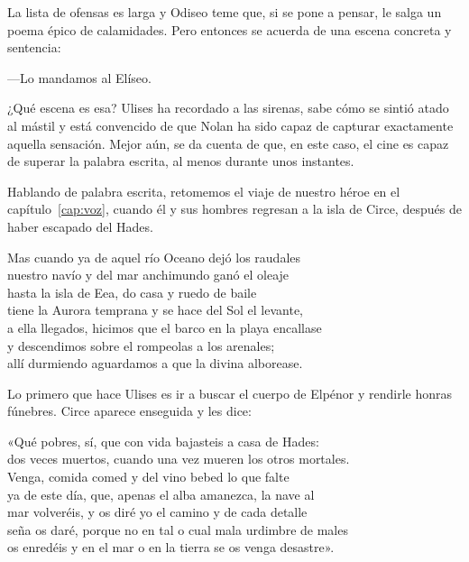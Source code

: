 La lista de ofensas es larga y Odiseo teme que, si se pone a pensar, le salga un poema épico de calamidades. Pero entonces se acuerda de una escena concreta y sentencia:

---Lo mandamos al Elíseo.

¿Qué escena es esa? 
Ulises ha recordado a las sirenas, sabe cómo se sintió atado al mástil y está convencido de que Nolan ha sido capaz de capturar exactamente aquella sensación. Mejor aún, se da cuenta de que, en este caso, el cine es capaz de superar la palabra escrita, al menos durante unos instantes.

Hablando de palabra escrita, retomemos el viaje de nuestro héroe en el capítulo~\ref{cap:voz}, cuando él y sus hombres regresan a la isla de Circe, después de haber escapado del Hades.

\begin{versocita}
Mas cuando ya de aquel río Oceano dejó los raudales\\
nuestro navío y del mar anchimundo ganó el oleaje\\
hasta la isla de Eea, do casa y ruedo de baile\\
tiene la Aurora temprana y se hace del Sol el levante,\\
a ella llegados, hicimos que el barco en la playa encallase\\
y descendimos sobre el rompeolas a los arenales;\\
allí durmiendo aguardamos a que la divina alborease.
\end{versocita}

Lo primero que hace Ulises es ir a buscar el cuerpo de Elpénor y rendirle honras fúnebres. Circe aparece enseguida y les dice:

\begin{versocita}
«Qué pobres, sí, que con vida bajasteis a casa de Hades:\\
dos veces muertos, cuando una vez mueren los otros mortales.\\
Venga, comida comed y del vino bebed lo que falte\\
ya de este día, que, apenas el alba amanezca, la nave al\\
mar volveréis, y os diré yo el camino y de cada detalle\\
seña os daré, porque no en tal o cual mala urdimbre de males\\
os enredéis y en el mar o en la tierra se os venga desastre».
\end{versocita}

